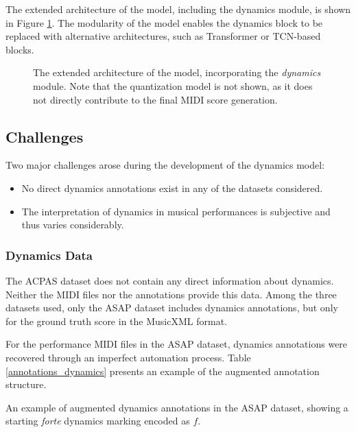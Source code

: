 The extended architecture of the model, including the dynamics module, is shown in Figure \ref{model_architecture_extended}. The modularity of the model enables the dynamics block to be replaced with alternative architectures, such as Transformer or TCN-based blocks.

\begin{figure}[!ht]
\centering
 \caption[Extended model architecture with dynamics module.]{The extended architecture of the model, incorporating the \emph{dynamics} module. Note that the quantization model is not shown, as it does not directly contribute to the final MIDI score generation.}
\label{model_architecture_extended}
\end{figure}

\subsection{Challenges}

Two major challenges arose during the development of the dynamics model:
\begin{itemize} \item No direct dynamics annotations exist in any of the datasets considered. \item The interpretation of dynamics in musical performances is subjective and thus varies considerably. \end{itemize}

\subsubsection{Dynamics Data}

The ACPAS dataset does not contain any direct information about dynamics. Neither the MIDI files nor the annotations provide this data. Among the three datasets used, only the ASAP dataset includes dynamics annotations, but only for the ground truth score in the MusicXML format.

For the performance MIDI files in the ASAP dataset, dynamics annotations were recovered through an imperfect automation process. Table \ref{annotations_dynamics} presents an example of the augmented annotation structure.

\begin{table}[ht!]
\centering

\caption[Dynamics TSV annotations for the ASAP dataset.]{An example of augmented dynamics annotations in the ASAP dataset, showing a starting \emph{forte} dynamics marking encoded as $f$.}
\label{annotations_dynamics}
\end{table}

